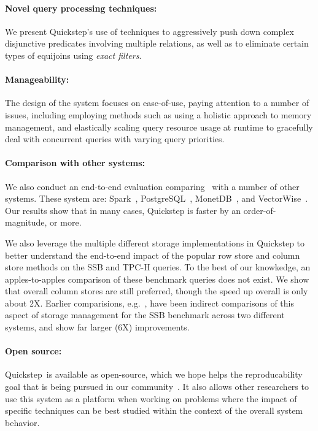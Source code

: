 \paragraph{Novel query processing techniques:} We present Quickstep's use of techniques to aggressively push down complex disjunctive predicates involving multiple relations, as well as to eliminate certain types of equijoins using \textit{exact filters}.

\paragraph{Manageability:} The design of the system focuses on ease-of-use, paying attention to a number of issues, including employing methods such as using a holistic approach to memory management, and elastically scaling query resource usage at runtime to gracefully deal with concurrent queries with varying query priorities.

\paragraph{Comparison with other systems:} We also conduct an end-to-end evaluation comparing \Quickstep\ with a number of other systems. These system are: Spark~\cite{Spark, SparkSQL}, PostgreSQL~\cite{postgres}, MonetDB~\cite{monetdb}, and VectorWise~\cite{vectorwise}. Our results show that in many cases, Quickstep is faster by an order-of-magnitude, or more.

We also leverage the multiple different storage implementations in Quickstep to better understand the end-to-end impact of the popular row store and column store methods on the SSB and TPC-H queries. To the best of our knowkedge, an apples-to-apples comparison of these benchmark queries does not exist. We show that overall column stores are still preferred, though the speed up overall is only about 2X. Earlier comparisions, e.g.~\cite{DBLP:conf/sigmod/AbadiMH08}, have been indirect comparisons of this aspect of storage management for the SSB benchmark across two different systems, and show far larger (6X) improvements. %

\paragraph{Open source:} Quickstep\ is available as open-source, which we hope helps the reproducability goal that is being pursued in our community~\cite{BonnetMBCGGHIIJKKMOPRTYFS11, ManegoldMAFGHHKKLLORSSWS09, ManolescuAADMPSSZS08}. It also allows other researchers to use this system as a platform when working on  problems where the impact of specific techniques can be best studied within the context of the overall system behavior.

